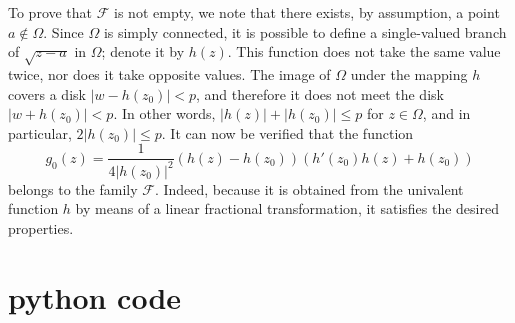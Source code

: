 \documentclass[
]{book}
\theoremstyle{definition}
\theoremstyle{definition}
\theoremstyle{definition}
\theoremstyle{definition}
\theoremstyle{remark}
\begin{document}
To prove that \(\mathcal{F}\) is not empty, we note that there exists, by assumption, a point \(a \notin \Omega\). Since \(\Omega\) is simply connected, it is possible to define a single-valued branch of \(\sqrt{z - a}\) in \(\Omega\); denote it by \(h(z)\). This function does not take the same value twice, nor does it take opposite values. The image of \(\Omega\) under the mapping \(h\) covers a disk \(|w - h(z_0)| < p\), and therefore it does not meet the disk \(|w + h(z_0)| < p\). In other words, \(|h(z)| + |h(z_0)| \leq p\) for \(z \in \Omega\), and in particular, \(2|h(z_0)| \leq p\). It can now be verified that the function
\[ g_0(z) = \frac{1}{4|h(z_0)|^2} \left(h(z) - h(z_0)\right) \left(h'(z_0) h(z) + h(z_0)\right) \]
belongs to the family \(\mathcal{F}\). Indeed, because it is obtained from the univalent function \(h\) by means of a linear fractional transformation, it satisfies the desired properties.

\chapter{python code}\label{python-code}
\end{document}
